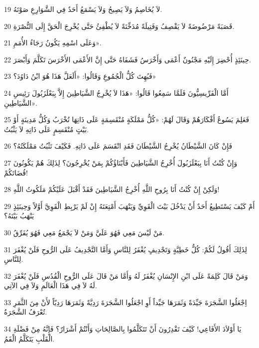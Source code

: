 \par 19 لاَ يُخَاصِمُ وَلاَ يَصِيحُ وَلاَ يَسْمَعُ أَحَدٌ فِي الشَّوَارِعِ صَوْتَهُ.
\par 20 قَصَبَةً مَرْضُوضَةً لاَ يَقْصِفُ وَفَتِيلَةً مُدَخِّنَةً لاَ يُطْفِئُ حَتَّى يُخْرِجَ الْحَقَّ إِلَى النُّصْرَةِ.
\par 21 وَعَلَى اسْمِهِ يَكُونُ رَجَاءُ الأُمَمِ».
\par 22 حِينَئِذٍ أُحْضِرَ إِلَيْهِ مَجْنُونٌ أَعْمَى وَأَخْرَسُ فَشَفَاهُ حَتَّى إِنَّ الأَعْمَى الأَخْرَسَ تَكَلَّمَ وَأَبْصَرَ.
\par 23 فَبُهِتَ كُلُّ الْجُمُوعِ وَقَالُوا: «أَلَعَلَّ هَذَا هُوَ ابْنُ دَاوُدَ؟»
\par 24 أَمَّا الْفَرِّيسِيُّونَ فَلَمَّا سَمِعُوا قَالُوا: «هَذَا لاَ يُخْرِجُ الشَّيَاطِينَ إِلاَّ بِبَعْلَزَبُولَ رَئِيسِ الشَّيَاطِينِ».
\par 25 فَعَلِمَ يَسُوعُ أَفْكَارَهُمْ وَقَالَ لَهُمْ: «كُلُّ مَمْلَكَةٍ مُنْقَسِمَةٍ عَلَى ذَاتِهَا تُخْرَبُ وَكُلُّ مَدِينَةٍ أَوْ بَيْتٍ مُنْقَسِمٍ عَلَى ذَاتِهِ لاَ يَثْبُتُ.
\par 26 فَإِنْ كَانَ الشَّيْطَانُ يُخْرِجُ الشَّيْطَانَ فَقَدِ انْقَسَمَ عَلَى ذَاتِهِ. فَكَيْفَ تَثْبُتُ مَمْلَكَتُهُ؟
\par 27 وَإِنْ كُنْتُ أَنَا بِبَعْلَزَبُولَ أُخْرِجُ الشَّيَاطِينَ فَأَبْنَاؤُكُمْ بِمَنْ يُخْرِجُونَ؟ لِذَلِكَ هُمْ يَكُونُونَ قُضَاتَكُمْ!
\par 28 وَلَكِنْ إِنْ كُنْتُ أَنَا بِرُوحِ اللَّهِ أُخْرِجُ الشَّيَاطِينَ فَقَدْ أَقْبَلَ عَلَيْكُمْ مَلَكُوتُ اللَّهِ!
\par 29 أَمْ كَيْفَ يَسْتَطِيعُ أَحَدٌ أَنْ يَدْخُلَ بَيْتَ الْقَوِيِّ وَيَنْهَبَ أَمْتِعَتَهُ إِنْ لَمْ يَرْبِطِ الْقَوِيَّ أَوَّلاً وَحِينَئِذٍ يَنْهَبُ بَيْتَهُ؟
\par 30 مَنْ لَيْسَ مَعِي فَهُوَ عَلَيَّ وَمَنْ لاَ يَجْمَعُ مَعِي فَهُوَ يُفَرِّقُ.
\par 31 لِذَلِكَ أَقُولُ لَكُمْ: كُلُّ خَطِيَّةٍ وَتَجْدِيفٍ يُغْفَرُ لِلنَّاسِ وَأَمَّا التَّجْدِيفُ عَلَى الرُّوحِ فَلَنْ يُغْفَرَ لِلنَّاسِ.
\par 32 وَمَنْ قَالَ كَلِمَةً عَلَى ابْنِ الإِنْسَانِ يُغْفَرُ لَهُ وَأَمَّا مَنْ قَالَ عَلَى الرُّوحِ الْقُدُسِ فَلَنْ يُغْفَرَ لَهُ لاَ فِي هَذَا الْعَالَمِ وَلاَ فِي الآتِي.
\par 33 اِجْعَلُوا الشَّجَرَةَ جَيِّدَةً وَثَمَرَهَا جَيِّداً أَوِ اجْعَلُوا الشَّجَرَةَ رَدِيَّةً وَثَمَرَهَا رَدِيّاً لأَنْ مِنَ الثَّمَرِ تُعْرَفُ الشَّجَرَةُ.
\par 34 يَا أَوْلاَدَ الأَفَاعِي! كَيْفَ تَقْدِرُونَ أَنْ تَتَكَلَّمُوا بِالصَّالِحَاتِ وَأَنْتُمْ أَشْرَارٌ؟ فَإِنَّهُ مِنْ فَضْلَةِ الْقَلْبِ يَتَكَلَّمُ الْفَمُ.
